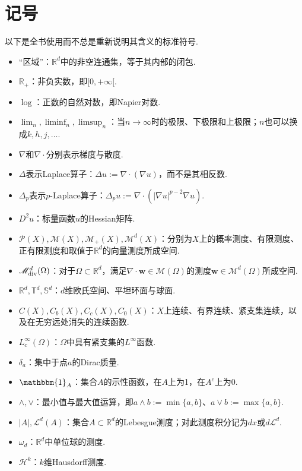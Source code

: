 \clearpage\section*{记号}\label{sec:notation}
以下是全书使用而不总是重新说明其含义的标准符号.
\begin{itemize}
\item “区域”：$\mathbb R^d$中的非空连通集，等于其内部的闭包.
\item $\mathbb R_+$：非负实数，即$[0,+\infty[$.
\item $\log$：正数的自然对数，即Napier对数.
\item $\lim_n,\liminf_n,\limsup_n$：当$n\to\infty$时的极限、下极限和上极限；$n$也可以换成$k,h,j,\ldots$.
\item $\nabla$和$\nabla\cdot$分别表示梯度与散度.
\item $\Delta$表示Laplace算子：$\Delta u:=\nabla\cdot(\nabla u)$，而不是其相反数.
\item $\Delta_p$表示$p$-Laplace算子：$\Delta_p u:=\nabla\cdot(|\nabla u|^{p-2}\nabla u)$.
\item $D^2u$：标量函数$u$的Hessian矩阵.
\item $\mathscr P(X),\mathscr M(X),\mathscr M_+(X),\mathscr M^d(X)$：分别为$X$上的概率测度、有限测度、正有限测度和取值于$\mathbb R^d$的向量测度所成空间.
\item $\mathscr M^d_{\rm div}(\Omega)$：对于$\Omega\subset\mathbb R^d$，满足$\nabla\cdot\mathbf w\in\mathscr M(\Omega)$的测度$\mathbf w\in\mathscr M^d(\Omega)$所成空间.
\item $\mathbb R^d,\mathbb T^d,\mathbb S^d$：$d$维欧氏空间、平坦环面与球面.
\item $C(X),C_b(X),C_c(X),C_0(X)$：$X$上连续、有界连续、紧支集连续，以及在无穷远处消失的连续函数.
\item $L_c^\infty(\Omega)$：$\Omega$中具有紧支集的$L^\infty$函数.
\item $\delta_a$：集中于点$a$的Dirac质量.
\item $\mathbbm{1}_A$：集合$A$的示性函数，在$A$上为1，在$A^c$上为0.
\item $\wedge,\vee$：最小值与最大值运算，即$a\wedge b:=\min\{a,b\}$、$a\vee b:=\max\{a,b\}$.
\item $|A|,\mathscr L^d(A)$：集合$A\subset\mathbb R^d$的Lebesgue测度；对此测度积分记为$dx$或$d\mathscr L^d$.
\item $\omega_d$：$\mathbb R^d$中单位球的测度.
\item $\mathscr H^k$：$k$维Hausdorff测度.

\end{itemize}

